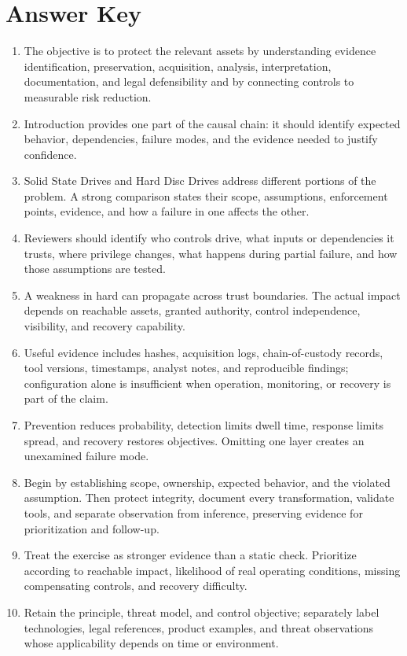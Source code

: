 \documentclass[11pt,letterpaper]{article}
\begin{document}
\section*{Answer Key}
\begin{enumerate}
\item The objective is to protect the relevant assets by understanding evidence identification, preservation, acquisition, analysis, interpretation, documentation, and legal defensibility and by connecting controls to measurable risk reduction.
\item Introduction provides one part of the causal chain: it should identify expected behavior, dependencies, failure modes, and the evidence needed to justify confidence.
\item Solid State Drives and Hard Disc Drives address different portions of the problem. A strong comparison states their scope, assumptions, enforcement points, evidence, and how a failure in one affects the other.
\item Reviewers should identify who controls drive, what inputs or dependencies it trusts, where privilege changes, what happens during partial failure, and how those assumptions are tested.
\item A weakness in hard can propagate across trust boundaries. The actual impact depends on reachable assets, granted authority, control independence, visibility, and recovery capability.
\item Useful evidence includes hashes, acquisition logs, chain-of-custody records, tool versions, timestamps, analyst notes, and reproducible findings; configuration alone is insufficient when operation, monitoring, or recovery is part of the claim.
\item Prevention reduces probability, detection limits dwell time, response limits spread, and recovery restores objectives. Omitting one layer creates an unexamined failure mode.
\item Begin by establishing scope, ownership, expected behavior, and the violated assumption. Then protect integrity, document every transformation, validate tools, and separate observation from inference, preserving evidence for prioritization and follow-up.
\item Treat the exercise as stronger evidence than a static check. Prioritize according to reachable impact, likelihood of real operating conditions, missing compensating controls, and recovery difficulty.
\item Retain the principle, threat model, and control objective; separately label technologies, legal references, product examples, and threat observations whose applicability depends on time or environment.
\end{enumerate}
\end{document}
